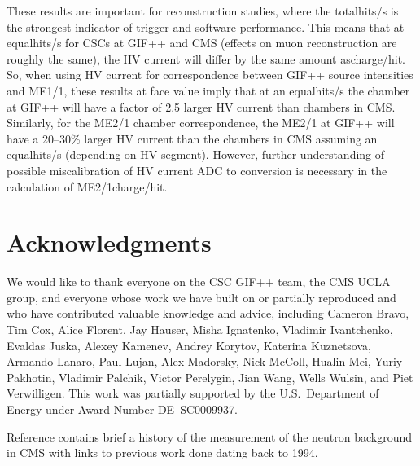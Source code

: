 These results are important for reconstruction studies, where the total\unit{hits/s} is the strongest indicator of trigger and software performance. This means that at equal\unit{hits/s} for CSCs at GIF++ and CMS (effects on muon reconstruction are roughly the same), the HV current will differ by the same amount as\unit{charge/hit}. So, when using HV current for correspondence between GIF++ source intensities and ME1/1, these results at face value imply that at an equal\unit{hits/s} the chamber at GIF++ will have a factor of 2.5 larger HV current than chambers in CMS. Similarly, for the ME2/1 chamber correspondence, the ME2/1 at GIF++ will have a 20--30\% larger HV current than the chambers in CMS assuming an equal\unit{hits/s} (depending on HV segment). However, further understanding of possible miscalibration of HV current ADC to \muA conversion is necessary in the calculation of ME2/1\unit{charge/hit}.

\section{Acknowledgments}
\label{sec:acknowledgments}

	We would like to thank everyone on the CSC GIF++ team, the CMS UCLA group, and everyone whose work we have built on or partially reproduced and who have contributed valuable knowledge and advice, including Cameron Bravo, Tim Cox, Alice Florent, Jay Hauser, Misha Ignatenko, Vladimir Ivantchenko, Evaldas Juska, Alexey Kamenev, Andrey Korytov, Katerina Kuznetsova, Armando Lanaro, Paul Lujan, Alex Madorsky, Nick McColl, Hualin Mei, Yuriy Pakhotin, Vladimir Palchik, Victor Perelygin, Jian Wang, Wells Wulsin, and Piet Verwilligen. This work was partially supported by the U.S.\ Department of Energy under Award Number {DE}--{SC}0009937.

Reference \cite{PietsPage} contains brief a history of the measurement of the neutron background in CMS with links to previous work done dating back to 1994.
